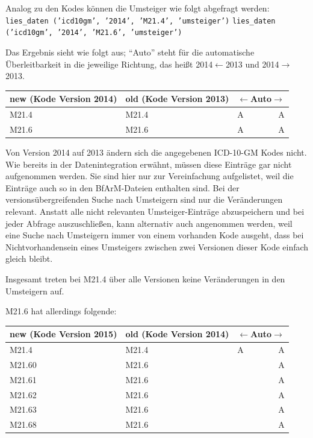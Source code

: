Analog zu den Kodes können die Umsteiger wie folgt abgefragt werden: \newline
\texttt{lies\_daten ('icd10gm', '2014', 'M21.4', 'umsteiger')} \newline
\texttt{lies\_daten ('icd10gm', '2014', 'M21.6', 'umsteiger')}

Das Ergebnis sieht wie folgt aus; ``Auto'' steht für die automatische Überleitbarkeit in die jeweilige Richtung, das heißt 2014$\leftarrow$2013 und 2014$\rightarrow$2013.

\begin{centernss}
\renewcommand{\arraystretch}{1.2}
\begin{tabular}{p{136pt}p{136pt}lr}
new (Kode Version 2014) & old (Kode Version 2013) & \multicolumn{2}{c}{$\leftarrow$Auto$\rightarrow$} \\
\hline
M21.4 & M21.4 & A & A \\
M21.6 & M21.6 & A & A \\
\end{tabular}
\end{centernss}

Von Version 2014 auf 2013 ändern sich die angegebenen ICD-10-GM Kodes nicht. Wie bereits in der Datenintegration erwähnt, müssen diese Einträge gar nicht aufgenommen werden. Sie sind hier nur zur Vereinfachung aufgelistet, weil die Einträge auch so in den BfArM-Dateien enthalten sind. Bei der versionsübergreifenden Suche nach Umsteigern sind nur die Veränderungen relevant. Anstatt alle nicht relevanten Umsteiger-Einträge abzuspeichern und bei jeder Abfrage auszuschließen, kann alternativ auch angenommen werden, weil eine Suche nach Umsteigern immer von einem vorhanden Kode ausgeht, dass bei Nichtvorhandensein eines Umsteigers zwischen zwei Versionen dieser Kode einfach gleich bleibt.

Insgesamt treten bei M21.4 über alle Versionen keine Veränderungen in den Umsteigern auf.

M21.6 hat allerdings folgende:

\begin{centernss}
\renewcommand{\arraystretch}{1.2}
\begin{tabular}{p{136pt}p{136pt}lr}
new (Kode Version 2015) & old (Kode Version 2014) & \multicolumn{2}{c}{$\leftarrow$Auto$\rightarrow$} \\
\hline
M21.4 & M21.4 & A & A \\
M21.60 & M21.6 & & A \\
M21.61 & M21.6 & & A \\
M21.62 & M21.6 & & A \\
M21.63 & M21.6 & & A \\
M21.68 & M21.6 & & A \\
\end{tabular}
\end{centernss}

